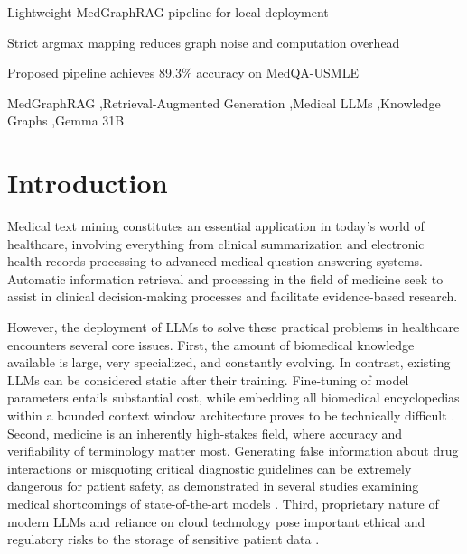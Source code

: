 \documentclass[a4paper,fleqn]{cas-sc}
\begin{document}
\begin{highlights}
\item Lightweight MedGraphRAG pipeline for local deployment
\item Strict argmax mapping reduces graph noise and computation overhead
\item Proposed pipeline achieves 89.3\% accuracy on MedQA-USMLE
\end{highlights}

\begin{keywords}
MedGraphRAG \sep Retrieval-Augmented Generation \sep Medical LLMs \sep Knowledge Graphs \sep Gemma 31B
\end{keywords}

\maketitle

\section{Introduction}
Medical text mining constitutes an essential application in today's world of healthcare, involving everything from clinical summarization and electronic health records processing to advanced medical question answering systems. Automatic information retrieval and processing in the field of medicine seek to assist in clinical decision-making processes and facilitate evidence-based research.

However, the deployment of LLMs to solve these practical problems in healthcare encounters several core issues. First, the amount of biomedical knowledge available is large, very specialized, and constantly evolving. In contrast, existing LLMs can be considered static after their training. Fine-tuning of model parameters entails substantial cost, while embedding all biomedical encyclopedias within a bounded context window architecture proves to be technically difficult \cite{wu2024medgraphrag}. Second, medicine is an inherently high-stakes field, where accuracy and verifiability of terminology matter most. Generating false information about drug interactions or misquoting critical diagnostic guidelines can be extremely dangerous for patient safety, as demonstrated in several studies examining medical shortcomings of state-of-the-art models \cite{singhal2023medpalm2,saab2024gemini,wang2023prompt,savage2024diagnostic}. Third, proprietary nature of modern LLMs and reliance on cloud technology pose important ethical and regulatory risks to the storage of sensitive patient data \cite{wu2024medgraphrag,miao2024integrating}.
\end{document}
